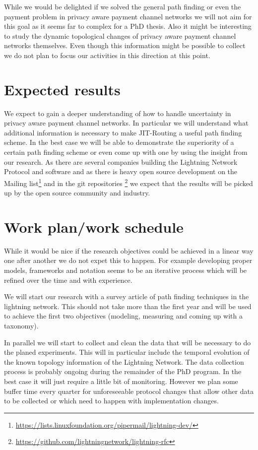 \documentclass[a4paper]{paper}
\begin{document}
While we would be delighted if we solved the general path finding or even the payment problem in privacy aware payment channel networks we will not aim for this goal as it seems far to complex for a PhD thesis.
Also it might be interesting to study the dynamic topological changes of privacy aware payment channel networks themselves.
Even though this information might be possible to collect we do not plan to focus our activities in this direction at this point.

\section{Expected results}
We expect to gain a deeper understanding of how to handle uncertainty in privacy aware payment channel networks.
In particular we will understand what additional information is necessary to make JIT-Routing a useful path finding scheme. 
In the best case we will be able to demonstrate the superiority of a certain path finding scheme or even come up with one by using the insight from our research.
As there are several companies building the Lightning Network Protocol and software and as there is heavy open source development on the Mailing list\footnote{\url{https://lists.linuxfoundation.org/pipermail/lightning-dev/}} and in the git repositories \footnote{\url{https://github.com/lightningnetwork/lightning-rfc}} we expect that the results will be picked up by the open source community and industry.

\section{Work plan/work schedule}
While it would be nice if the research objectives could be achieved in a linear way one after another we do not expet this to happen.
For example developing proper models, frameworks and notation seems to be an iterative process which will be refined over the time and with experience.

We will start our research with a survey article of path finding techniques in the lightning network.
This should not take more than the first year and will be used to achieve the first two objectives (modeling, measuring and coming up with a taxonomy).

In parallel we will start to collect and clean the data that will be necessary to do the planed experiments.
This will in particular include the temporal evolution of the known topology information of the Lightning Network.
The data collection process is probably ongoing during the remainder of the PhD program.
In the best case it will just require a little bit of monitoring.
However we plan some buffer time every quarter for unforeseeable protocol changes that allow other data to be collected or which need to happen with implementation changes.
\end{document}
